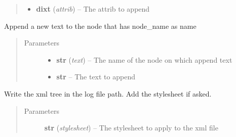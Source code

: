 \documentclass[a4paper,10pt,english]{sphinxmanual}
\begin{document}
\begin{fulllineitems}
\begin{fulllineitems}
\begin{quote}
\begin{description}
\begin{itemize}
\item {} 
\textbf{dixt} (\emph{attrib}) -- The attrib to append

\end{itemize}

\end{description}\end{quote}

\end{fulllineitems}


\begin{fulllineitems}
\label{commands/apidoc/src:src.xmlManager.XmlLogFile.append_node_text}
Append a new text to the node that has node\_name as name
\begin{quote}\begin{description}
\item[{Parameters}] \leavevmode\begin{itemize}
\item {} 
\textbf{str} (\emph{text}) -- The name of the node on which append text

\item {} 
\textbf{str} -- The text to append

\end{itemize}

\end{description}\end{quote}

\end{fulllineitems}


\begin{fulllineitems}
\label{commands/apidoc/src:src.xmlManager.XmlLogFile.write_tree}
Write the xml tree in the log file path. Add the stylesheet if asked.
\begin{quote}\begin{description}
\item[{Parameters}] \leavevmode
\textbf{str} (\emph{stylesheet}) -- The stylesheet to apply to the xml file

\end{description}\end{quote}

\end{fulllineitems}


\end{fulllineitems}
\end{document}
